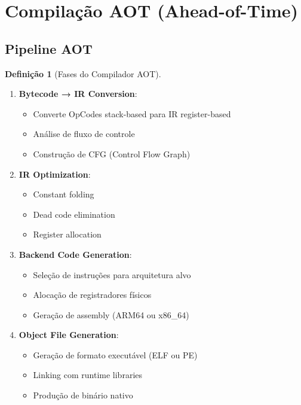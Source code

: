 \documentclass[12pt,a4paper]{article}
\theoremstyle{definition}
\newtheorem{definition}{Definição}[section]
\begin{document}
\section{Compilação AOT (Ahead-of-Time)}

\subsection{Pipeline AOT}

\begin{definition}[Fases do Compilador AOT]
\begin{enumerate}
    \item \textbf{Bytecode → IR Conversion}:
    \begin{itemize}
        \item Converte OpCodes stack-based para IR register-based
        \item Análise de fluxo de controle
        \item Construção de CFG (Control Flow Graph)
    \end{itemize}
    
    \item \textbf{IR Optimization}:
    \begin{itemize}
        \item Constant folding
        \item Dead code elimination
        \item Register allocation
    \end{itemize}
    
    \item \textbf{Backend Code Generation}:
    \begin{itemize}
        \item Seleção de instruções para arquitetura alvo
        \item Alocação de registradores físicos
        \item Geração de assembly (ARM64 ou x86\_64)
    \end{itemize}
    
    \item \textbf{Object File Generation}:
    \begin{itemize}
        \item Geração de formato executável (ELF ou PE)
        \item Linking com runtime libraries
        \item Produção de binário nativo
    \end{itemize}
\end{enumerate}
\end{definition}
\end{document}

